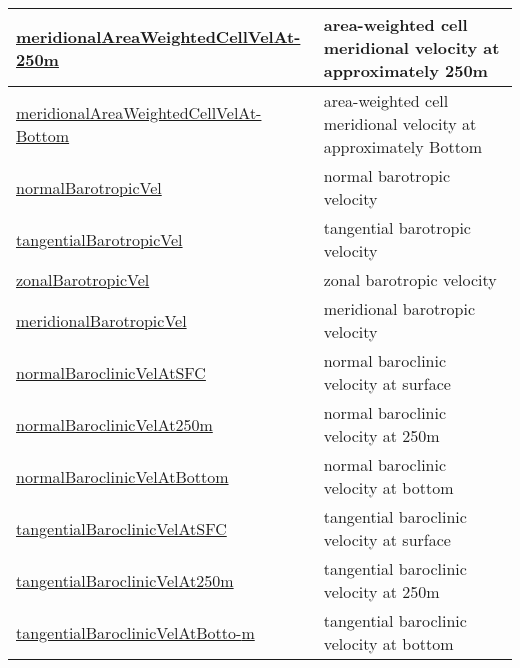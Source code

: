 {\begin{center}
\begin{longtable}{| p{2.0in} | p{4.0in} |}
    \hline
    \hyperref[subsec:var_sec_highFrequencyOutputAM_meridionalAreaWeightedCellVelAt250m]{meridionalAreaWeightedCellVelAt-}\hyperref[subsec:var_sec_highFrequencyOutputAM_meridionalAreaWeightedCellVelAt250m]{250m  }& area-weighted cell meridional velocity at approximately 250m \\
    \hline
    \hyperref[subsec:var_sec_highFrequencyOutputAM_meridionalAreaWeightedCellVelAtBottom]{meridionalAreaWeightedCellVelAt-}\hyperref[subsec:var_sec_highFrequencyOutputAM_meridionalAreaWeightedCellVelAtBottom]{Bottom  }& area-weighted cell meridional velocity at approximately Bottom \\
    \hline
    \hyperref[subsec:var_sec_highFrequencyOutputAM_normalBarotropicVel]{normalBarotropicVel} & normal barotropic velocity \\
    \hline
    \hyperref[subsec:var_sec_highFrequencyOutputAM_tangentialBarotropicVel]{tangentialBarotropicVel} & tangential barotropic velocity \\
    \hline
    \hyperref[subsec:var_sec_highFrequencyOutputAM_zonalBarotropicVel]{zonalBarotropicVel} & zonal barotropic velocity \\
    \hline
    \hyperref[subsec:var_sec_highFrequencyOutputAM_meridionalBarotropicVel]{meridionalBarotropicVel} & meridional barotropic velocity \\
    \hline
    \hyperref[subsec:var_sec_highFrequencyOutputAM_normalBaroclinicVelAtSFC]{normalBaroclinicVelAtSFC} & normal baroclinic velocity at surface \\
    \hline
    \hyperref[subsec:var_sec_highFrequencyOutputAM_normalBaroclinicVelAt250m]{normalBaroclinicVelAt250m} & normal baroclinic velocity at 250m \\
    \hline
    \hyperref[subsec:var_sec_highFrequencyOutputAM_normalBaroclinicVelAtBottom]{normalBaroclinicVelAtBottom} & normal baroclinic velocity at bottom \\
    \hline
    \hyperref[subsec:var_sec_highFrequencyOutputAM_tangentialBaroclinicVelAtSFC]{tangentialBaroclinicVelAtSFC} & tangential baroclinic velocity at surface \\
    \hline
    \hyperref[subsec:var_sec_highFrequencyOutputAM_tangentialBaroclinicVelAt250m]{tangentialBaroclinicVelAt250m} & tangential baroclinic velocity at 250m \\
    \hline
    \hyperref[subsec:var_sec_highFrequencyOutputAM_tangentialBaroclinicVelAtBottom]{tangentialBaroclinicVelAtBotto-}\hyperref[subsec:var_sec_highFrequencyOutputAM_tangentialBaroclinicVelAtBottom]{m  }& tangential baroclinic velocity at bottom \\

\end{longtable}
\end{center}}
